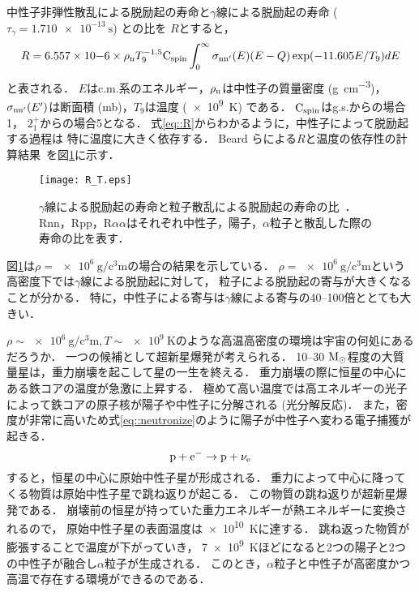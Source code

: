 \documentclass[../master]{subfiles}
\begin{document}
中性子非弾性散乱による脱励起の寿命と$\gamma$線による脱励起の寿命 ($\tau_{\gamma} = \SI{1.710e-13}{\second}$) との比を
$R$とすると，
\begin{equation}
  R = 6.557\times10{-6}\times\rho_{\rm n}T_{9}^{-1.5}{\rm C}_{{\rm spin}}
  \int^{\infty}_{0}\sigma_{\rm nn'}(E)(E-Q)\exp(-11.605E/T_{9})dE
  \label{eq::R}
\end{equation}
と表される．
$E$はc.m.系のエネルギー，$\rho_{\rm n}$は中性子の質量密度 (\si{\gram\per\cubic\centi\metre})，
$\sigma_{\rm nn'}(E')$は断面積 (\si{\milli\barn})，$T_{9}$は温度 (\SI{e9}{\kelvin}) である．
${\rm C}_{{\rm spin}}$はg.s.からの場合1，
$2_{1}^{+}$からの場合5となる．
式\eqref{eq::R}からわかるように，中性子によって脱励起する過程は
特に温度に大きく依存する．
Beard らによる$R$と温度の依存性の計算結果~\cite{hotdensemedium}を図\ref{fig::R}に示す．
\begin{figure}
  \centering
  \texttt{[image: R\_T.eps]}
  \caption[$\gamma$線による脱励起の寿命と粒子散乱による脱励起の寿命の比．]
          {$\gamma$線による脱励起の寿命と粒子散乱による脱励起の寿命の比~\cite{hotdensemedium}．
    Rnn，Rpp，R$\alpha\alpha$はそれぞれ中性子，陽子，$\alpha$粒子と散乱した際の寿命の比を表す．}
  \label{fig::R}
\end{figure}
図\ref{fig::R}は$\rho = \SI{e6}{\gram\per\cubic\centi\metre}$の場合の結果を示している．
$\rho = \SI{e6}{\gram\per\cubic\centi\metre}$という高密度下では$\gamma$線による脱励起に対して，
粒子による脱励起の寄与が大きくなることが分かる．
特に，中性子による寄与は$\gamma$線による寄与の40--100倍ととても大きい．

$\rho\sim\SI{e6}{\gram\per\cubic\centi\metre}, T\sim\SI{e9}{\kelvin}$のような高温高密度の環境は宇宙の何処にあるだろうか．
一つの候補として超新星爆発が考えられる．
10--30 $\rm M_{\odot}$程度の大質量星は，重力崩壊を起こして星の一生を終える．
重力崩壊の際に恒星の中心にある鉄コアの温度が急激に上昇する．
極めて高い温度では高エネルギーの光子によって鉄コアの原子核が陽子や中性子に分解される (光分解反応)．
また，密度が非常に高いため式\eqref{eq::neutronize}のように陽子が中性子へ変わる電子捕獲が起きる．
\begin{equation}
  {\rm p}+{\rm e}^{-} \rightarrow {\rm p}+\nu_{\rm e}
  \label{eq::neutronize}
\end{equation}
すると，恒星の中心に原始中性子星が形成される．
重力によって中心に降ってくる物質は原始中性子星で跳ね返りが起こる．
この物質の跳ね返りが超新星爆発である．
崩壊前の恒星が持っていた重力エネルギーが熱エネルギーに変換されるので，
原始中性子星の表面温度は\SI{e10}{\kelvin}に達する．
跳ね返った物質が膨張することで温度が下がっていき，
\SI{7e9}{\kelvin}ほどになると2つの陽子と2つの中性子が融合し$\alpha$粒子が生成される．
このとき，$\alpha$粒子と中性子が高密度かつ高温で存在する環境ができるのである．
\end{document}
